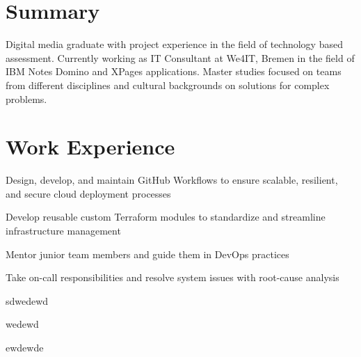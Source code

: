 \documentclass[]{deedy-resume-openfont}
\begin{document}
    
%
%
%
%
\sectionsep
\section{Summary}
\vspace{5pt}
Digital media graduate with project experience in the field of technology based assessment. Currently working as IT Consultant at We4IT, Bremen in the field of IBM Notes Domino and XPages applications. Master studies focused on teams from different disciplines and cultural backgrounds on solutions for complex problems.\\
%
%
\section{Work Experience}
\hfill {}
\begin{tightemize}
	\item Design, develop, and maintain GitHub Workflows to ensure scalable, resilient, and secure cloud deployment processes
	\item Develop reusable custom Terraform modules to standardize and streamline infrastructure management
	\item Mentor junior team members and guide them in DevOps practices
	\item Take on-call responsibilities and resolve system issues with root-cause analysis
\end{tightemize}
\sectionsep
{}\hfill {}
\begin{tightemize}
	\item sdwedewd
	\item wedewd
	\item ewdewde
\end{tightemize}
\sectionsep
%
%
\end{document}
